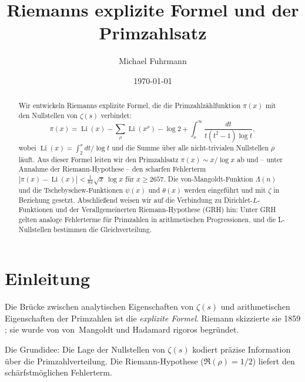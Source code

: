 \documentclass[12pt,a4paper]{amsart}
\theoremstyle{definition}
\DeclareMathOperator{\Li}{Li}
\begin{document}

\title{Riemanns explizite Formel und der Primzahlsatz}

\author{Michael Fuhrmann}
\address{Specialist Mathematics Project, Build 84}
\date{\today}

\begin{abstract}
Wir entwickeln Riemanns explizite Formel, die die Primzahlz\"ahlfunktion
$\pi(x)$ mit den Nullstellen von $\zeta(s)$ verbindet:
\[
  \pi(x) = \Li(x) - \sum_\rho \Li(x^\rho) - \log 2
  + \int_x^{\infty} \frac{dt}{t(t^2-1)\log t},
\]
wobei $\Li(x) = \int_2^x dt/\log t$ und die Summe \"uber alle nicht-trivialen
Nullstellen $\rho$ l\"auft.
Aus dieser Formel leiten wir den Primzahlsatz
$\pi(x) \sim x/\log x$ ab und -- unter Annahme der Riemann-Hypothese --
den scharfen Fehlerterm $|\pi(x) - \Li(x)| < \tfrac{1}{8\pi}\sqrt{x}\,\log x$
f\"ur $x \ge 2657$.
Die von-Mangoldt-Funktion $\Lambda(n)$ und die Tschebyschew-Funktionen
$\psi(x)$ und $\theta(x)$ werden eingef\"uhrt und mit $\zeta$ in Beziehung gesetzt.
Abschlie\ss end weisen wir auf die Verbindung zu Dirichlet-$L$-Funktionen
und der Verallgemeinerten Riemann-Hypothese (GRH) hin:
Unter GRH gelten analoge Fehlerterme f\"ur Primzahlen in arithmetischen
Progressionen, und die L-Nullstellen bestimmen die Gleichverteilung.
\end{abstract}

\maketitle
\tableofcontents

\section{Einleitung}

Die Br\"ucke zwischen analytischen Eigenschaften von $\zeta(s)$ und
arithmetischen Eigenschaften der Primzahlen ist die \emph{explizite Formel}.
Riemann skizzierte sie 1859 \cite{Riemann1859};
sie wurde von von~Mangoldt \cite{vonMangoldt1895} und Hadamard \cite{Hadamard1896}
rigoros begr\"undet.

Die Grundidee: Die Lage der Nullstellen von $\zeta(s)$ kodiert pr\"azise
Information \"uber die Primzahlverteilung.
Die Riemann-Hypothese ($\Re(\rho) = 1/2$) liefert den sch\"arfstm\"oglichen
Fehlerterm.
\end{document}
